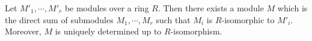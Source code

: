 Let $M'_1, \cdots, M'_r$ be modules over a ring $R$. Then there exists a module $M$ which is the direct sum of submodules $M_1, \cdots, M_r$ such that $M_i$ is $R$-isomorphic to $M'_i$. Moreover, $M$ is uniquely determined up to $R$-isomorphism.
